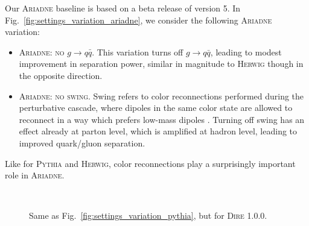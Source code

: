 \documentclass[11pt,letterpaper]{article}
\DeclareRobustCommand{\Fig}[1]{Fig.~\ref{#1}}
\begin{document}
Our \textsc{Ariadne} baseline is based on a beta release of version 5.  In \Fig{fig:settings_variation_ariadne}, we consider the following \textsc{Ariadne} variation:
\begin{itemize}
\item \textsc{Ariadne:  no $g \to q\bar{q}$}.  This variation turns off $g \to q \bar{q}$, leading to modest improvement in separation power, similar in magnitude to \textsc{Herwig} though in the opposite direction.
\item \textsc{Ariadne: no swing}.  Swing refers to color reconnections performed during the perturbative cascade, where dipoles in the same color state are allowed to reconnect in a way which prefers low-mass dipoles  \cite{Flensburg:2011kk,Bierlich:2014xba}.  Turning off swing has an effect already at parton level, which is amplified at hadron level, leading to improved quark/gluon separation.
\end{itemize}
Like for \textsc{Pythia} and \textsc{Herwig}, color reconnections play a surprisingly important role in \textsc{Ariadne}.


\begin{figure}
\centering
{}
$\qquad$
\caption{Same as \Fig{fig:settings_variation_pythia}, but for \textsc{Dire 1.0.0}.}
\label{fig:settings_variation_dire}
\end{figure}
\end{document}
